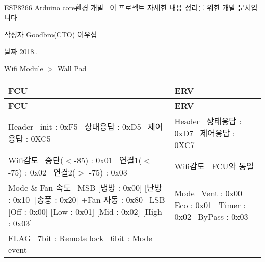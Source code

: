 E\+S\+P8266 Arduino core환경 개발~\newline
이 프로젝트 자세한 내용 정리를 위한 개발 문서입니다 \begin{DoxyAuthor}{작성자}
Goodbro(\+C\+T\+O) 이우섭 
\end{DoxyAuthor}
\begin{DoxyDate}{날짜}
2018..
\end{DoxyDate}
\begin{DoxyItemize}
\item Wifi Module $>$ Wall Pad \tabulinesep=1mm
\begin{longtabu} spread 0pt [c]{*{2}{|X[-1]}|}
\hline
\rowcolor{\tableheadbgcolor}\textbf{ F\+CU  }&\textbf{ E\+RV   }\\
\endfirsthead
\hline
\endfoot
\hline
\rowcolor{\tableheadbgcolor}\textbf{ F\+CU  }&\textbf{ E\+RV   }\\
\endhead
Header~\newline
 init \+: 0x\+F5~\newline
 상태응답 \+: 0x\+D5~\newline
 제어응답 \+: 0\+X\+C5  &Header~\newline
 상태응답 \+: 0x\+D7~\newline
 제어응답 \+: 0\+X\+C7   \\
Wifi감도~\newline
 중단($<$-\/85) \+: 0x01~\newline
 연결1($<$-\/75) \+: 0x02~\newline
 연결2($>$ -\/75) \+: 0x03  &Wifi감도~\newline
 F\+C\+U와 동일   \\
Mode \& Fan 속도~\newline
 M\+SB \mbox{[}냉방 \+: 0x00\mbox{]} \mbox{[}난방 \+: 0x10\mbox{]} \mbox{[}송풍 \+: 0x20\mbox{]} +\+Fan 자동 \+: 0x80~\newline
 L\+SB \mbox{[}Off \+: 0x00\mbox{]} \mbox{[}Low \+: 0x01\mbox{]} \mbox{[}Mid \+: 0x02\mbox{]} \mbox{[}High \+: 0x03\mbox{]}  &Mode~\newline
 Vent \+: 0x00~\newline
 Eco \+: 0x01~\newline
 Timer \+: 0x02~\newline
 By\+Pass \+: 0x03   \\
F\+L\+AG~\newline
 7bit \+: Remote lock~\newline
 6bit \+: Mode event~\newline

\end{longtabu}
\end{DoxyItemize}
